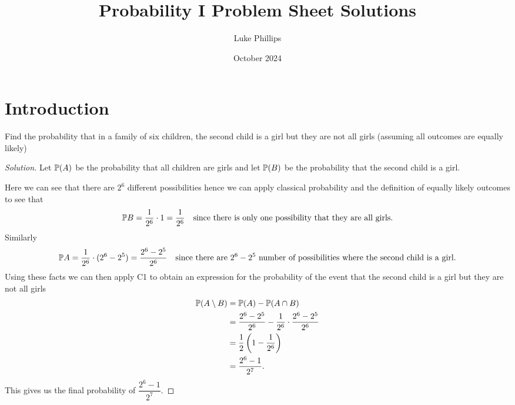 \documentclass[10pt, a4paper]{article}
\title{Probability I Problem Sheet Solutions}
\author{Luke Phillips}
\date{October 2024}
\begin{document}
\maketitle

\newpage

\section{Introduction}

\begin{problem}[35]
    Find the probability that in a family of six children, the second child is a girl but they are not all girls (assuming all outcomes are equally likely)
    
    \begin{proof}[Solution]\renewcommand{\qedsymbol}{}
        Let $\P(A)$ be the probability that all children are girls and let $\P(B)$ be the probability that the second child is a girl.

        Here we can see that there are $2 ^ 6$ different possibilities hence we can apply classical probability and the definition of equally likely outcomes to see that
        \[
        \P{B} = \frac{1}{2 ^ 6} \cdot 1 = \frac{1}{2 ^ 6}\quad\text{since there is only one possibility that they are all girls.}
        \]
        Similarly
        \[
        \P{A} = \frac{1}{2 ^ 6} \cdot (2 ^ 6 - 2 ^ 5) = \frac{2 ^ 6 - 2 ^  5}{2 ^ 6}\quad\text{since there are $2 ^ 6 - 2 ^ 5$ number of possibilities where the second child is a girl.}
        \]
        Using these facts we can then apply C1 to obtain an expression for the probability of the event that the second child is a girl but they are not all girls
        \begin{align*}
            \P(A \setminus B) &= \P(A) - \P(A \cap B) \\
            &= \frac{2 ^ 6 - 2 ^ 5}{2 ^ 6} - \frac{1}{2 ^ 6} \cdot \frac{2 ^ 6 - 2 ^ 5}{2 ^ 6} \\
            &= \frac{1}{2}\left(1 - \frac{1}{2 ^ 6}\right) \\
            &= \frac{2 ^ 6 - 1}{2 ^ 7}.
        \end{align*}
        This gives us the final probability of $\dfrac{2 ^ 6 - 1}{2 ^ 7}$.
    \end{proof}
\end{problem}
\end{document}
